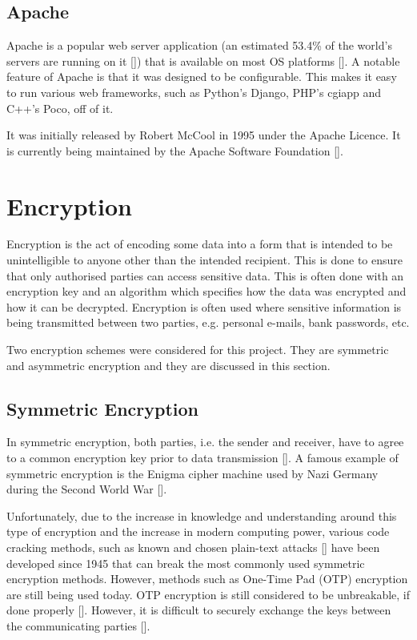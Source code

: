 \subsection{Apache}
\label{sec:apache}

Apache is a popular web server application (an estimated 53.4\% of the world's servers are
running on it [\cite{website:apache-usage}]) that is available on most OS platforms
[\cite{website:apache-platforms}]. A notable feature of Apache is that it was designed to
be configurable. This makes it easy to run various web frameworks, such as
Python's Django, PHP's cgiapp and C++'s Poco, off of it.

It was initially released by Robert McCool in 1995 under the Apache Licence. It is
currently being maintained by the Apache Software Foundation [\cite{website:apache}].

\section{Encryption}

Encryption is the act of encoding some data into a form that is intended to be
unintelligible to anyone other than the intended recipient.
This is done to ensure that only authorised parties can access sensitive data.
This is often done with an encryption key and an algorithm which
specifies how the data was encrypted and how it can be decrypted. Encryption is often used
where sensitive information is being transmitted between two parties, e.g. personal
e-mails, bank passwords, etc.

Two encryption schemes were considered for this project. They are symmetric
and asymmetric encryption and they are discussed in this section.

\subsection{Symmetric Encryption}

In symmetric encryption, both parties, i.e. the sender and receiver, have to agree to a common
encryption key prior to data transmission [\cite{article:symm-encryption}]. A famous
example of symmetric encryption is the Enigma cipher machine used by Nazi Germany
during the Second World War [\cite{article:enigma}].

Unfortunately, due to the increase in knowledge and understanding around this type of
encryption and the increase in modern computing power, various code cracking
methods, such as known and chosen plain-text attacks 
[\cite{journal:cypher-attacks}] have been developed since 1945 that can break
the most commonly used symmetric encryption methods. However, methods such as
One-Time Pad (OTP) encryption are still being used today. OTP encryption is still
considered to be unbreakable, if done properly [\cite{article:otp}]. However, it is
difficult to securely exchange the keys between the communicating parties
[\cite{article:otp}].

